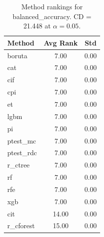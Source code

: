 \begin{table}[h]
\centering
\caption{Method rankings for balanced_accuracy. CD = 21.448 at $\alpha=0.05$.}
\label{tab:ranks_balanced_accuracy}
\begin{tabular}{lcc}
\toprule
Method & Avg Rank & Std \\
\midrule
boruta & 7.00 & 0.00 \\
cat & 7.00 & 0.00 \\
cif & 7.00 & 0.00 \\
cpi & 7.00 & 0.00 \\
et & 7.00 & 0.00 \\
lgbm & 7.00 & 0.00 \\
pi & 7.00 & 0.00 \\
ptest_mc & 7.00 & 0.00 \\
ptest_rdc & 7.00 & 0.00 \\
r_ctree & 7.00 & 0.00 \\
rf & 7.00 & 0.00 \\
rfe & 7.00 & 0.00 \\
xgb & 7.00 & 0.00 \\
cit & 14.00 & 0.00 \\
r_cforest & 15.00 & 0.00 \\
\bottomrule
\end{tabular}
\end{table}